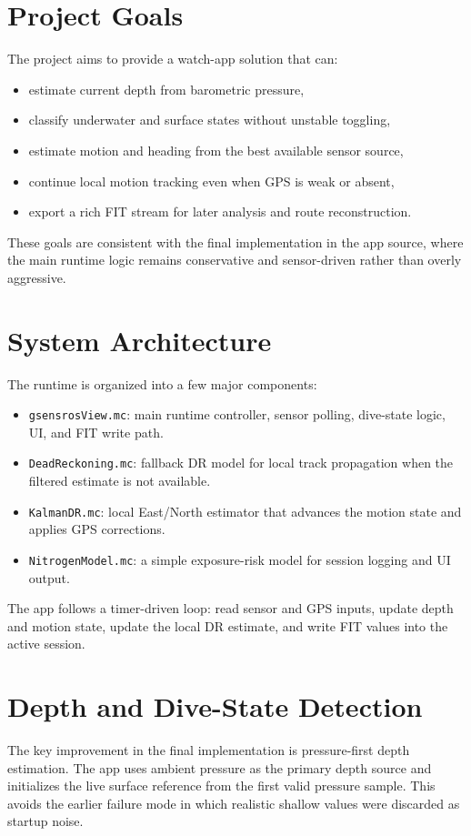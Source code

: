 \documentclass[conference]{IEEEtran}
\begin{document}
\section{Project Goals}
The project aims to provide a watch-app solution that can:
\begin{itemize}
\item estimate current depth from barometric pressure,
\item classify underwater and surface states without unstable toggling,
\item estimate motion and heading from the best available sensor source,
\item continue local motion tracking even when GPS is weak or absent,
\item export a rich FIT stream for later analysis and route reconstruction.
\end{itemize}

These goals are consistent with the final implementation in the app source, where the main runtime logic remains conservative and sensor-driven rather than overly aggressive.

\section{System Architecture}
The runtime is organized into a few major components:

\begin{itemize}
\item \texttt{gsensrosView.mc}: main runtime controller, sensor polling, dive-state logic, UI, and FIT write path.
\item \texttt{DeadReckoning.mc}: fallback DR model for local track propagation when the filtered estimate is not available.
\item \texttt{KalmanDR.mc}: local East/North estimator that advances the motion state and applies GPS corrections.
\item \texttt{NitrogenModel.mc}: a simple exposure-risk model for session logging and UI output.
\end{itemize}

The app follows a timer-driven loop: read sensor and GPS inputs, update depth and motion state, update the local DR estimate, and write FIT values into the active session.

\section{Depth and Dive-State Detection}
The key improvement in the final implementation is pressure-first depth estimation. The app uses ambient pressure as the primary depth source and initializes the live surface reference from the first valid pressure sample. This avoids the earlier failure mode in which realistic shallow values were discarded as startup noise.
\end{document}
